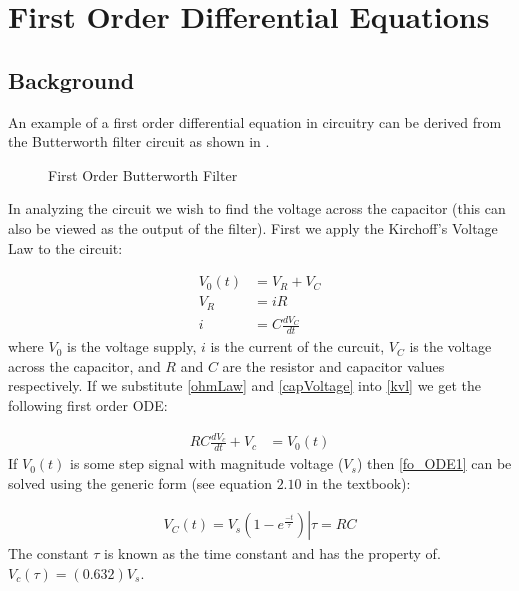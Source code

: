 \documentclass[main.tex]{subfile}
\begin{document}
\section{First Order Differential Equations}
\label{sec:foAnalysis}

\subsection{Background}
\label{sec:fo_analytical_view}

An example of a first order differential equation in circuitry can be derived
from the Butterworth filter circuit as shown in .

\begin{figure}[H]
	\begin{center}
	\end{center}
	\caption{First Order Butterworth Filter}
	\label{fig:foCircuit}
\end{figure}

In analyzing the circuit we wish to find the voltage across the capacitor (this
can also be viewed as the output of the filter). First we apply the Kirchoff's
Voltage Law to the circuit:

\begin{align}
	V_0(t) &= V_R + V_C \label{eq:kvl}
	\\V_R &= iR \label{eq:ohmLaw}
	\\i &= C\frac{dV_C}{dt} \label{eq:capVoltage}
\end{align}
where $V_0$ is the voltage supply, $i$ is the current of the curcuit, $V_C$ is
the voltage across the capacitor, and $R$ and $C$ are the resistor and capacitor
values respectively. If we substitute \eqref{ohmLaw} and \eqref{capVoltage} into
\eqref{kvl} we get the following first order ODE:

\begin{align}
	RC\frac{dV_c}{dt} + V_c &= V_0(t) \label{eq:fo_ODE1}
\end{align}
If $V_0(t)$ is some step signal with magnitude voltage ($V_s$) then
\eqref{fo_ODE1} can be solved using the generic form (see equation $2.10$ in the
textbook):

\begin{align}
	V_C(t) = \left. V_s(1 - e^{\frac{-t}{\tau}}) \right| \tau = RC \label{eq:fo_Vc}
\end{align}
The constant $\tau$ is known as the time constant and has the property of.
$V_c(\tau) = (0.632)V_s$.
\end{document}
